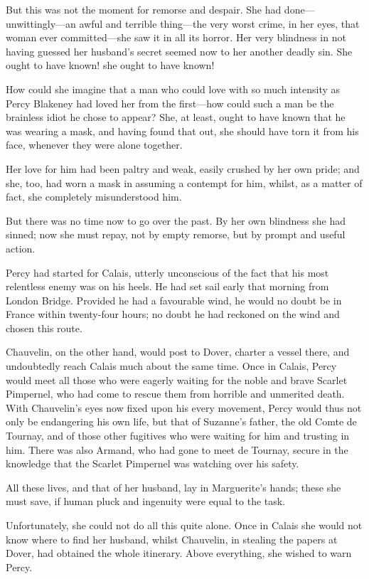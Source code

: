 \documentclass[paper=a5,BCOR=7mm,twoside,DIV=calc,12pt,usegeometry,chapterprefix,endperiod,headings=big]{scrbook}
\begin{document}
But this was not the moment for remorse and despair. She had done---unwittingly---an awful and terrible thing---the very worst crime, in her eyes, that woman ever  committed---she saw it in all its horror. Her very blindness in not having guessed her husband's secret seemed now to her another deadly sin. She ought to have known! she ought to have known!

How could she imagine that a man who could love with so much intensity as Percy Blakeney had loved her from the first---how could such a man be the brainless idiot he chose to appear? She, at least, ought to have known that he was wearing a mask, and having found that out, she should have torn it from his face, whenever they were alone together.

Her love for him had been paltry and weak, easily crushed by her own pride; and she, too, had worn a mask in assuming a contempt for him, whilst, as a matter of fact, she completely misunderstood him.

But there was no time now to go over the past. By her own blindness she had sinned; now she must repay, not by empty remorse, but by prompt and useful action.

Percy had started for Calais, utterly unconscious of the fact that his most relentless enemy was on his heels. He had set sail early that morning from London Bridge. Provided he had a favourable wind, he would no doubt be in France within twenty-four hours; no doubt he had reckoned on the wind and chosen this route.

Chauvelin, on the other hand, would post to Dover, charter a vessel there, and undoubtedly reach Calais much about the same time. Once in Calais, Percy would meet all those who were eagerly waiting for the noble and brave Scarlet Pimpernel, who had come to rescue them from horrible and unmerited death. With Chauvelin's eyes now fixed upon his every movement, Percy would thus not only be endangering his own life, but that of Suzanne's father, the old Comte de Tournay, and of those other fugitives who were waiting for him and trusting in him. There was also Armand, who had gone to meet de Tournay, secure in the knowledge that the Scarlet Pimpernel was watching over his safety.

All these lives, and that of her husband, lay in Marguerite's hands; these she must save, if human pluck and ingenuity were equal to the task.

Unfortunately, she could not do all this quite alone. Once in Calais she would not know where to find her husband, whilst Chauvelin, in stealing the papers at Dover, had obtained the whole itinerary. Above everything, she wished to warn Percy.
\end{document}
